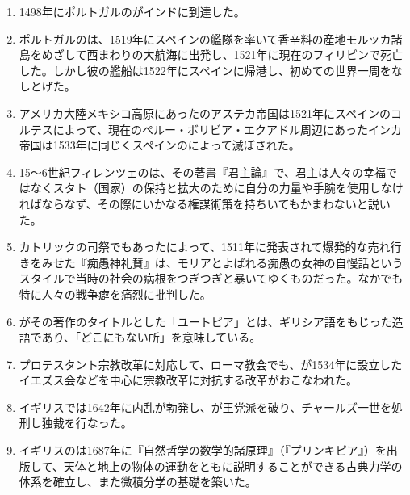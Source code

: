 \documentclass[uplatex,dvipdfmx]{jsarticle}
\newcounter{qnumber}\setcounter{qnumber}{1}
\def\anaume{\hspace{.5zw}\framebox[1.5cm]{\bf \theqnumber}\hspace{.5zw}\stepcounter{qnumber}}
\begin{document}
\begin{enumerate}


  
\item  1498年にポルトガルのがインドに到達した。

\item ポルトガルのは、1519年にスペインの艦隊を率いて香辛料の産地モルッカ諸島をめざして西まわりの大航海に出発し、1521年に現在のフィリピンで死亡した。しかし彼の艦船は1522年にスペインに帰港し、初めての世界一周をなしとげた。

  
\item  アメリカ大陸メキシコ高原にあったのアステカ帝国は1521年にスペインのコルテスによって、現在のペルー・ボリビア・エクアドル周辺にあったインカ帝国は1533年に同じくスペインのによって滅ぼされた。

\item 15〜6世紀フィレンツェのは、その著書『君主論』で、君主は人々の幸福ではなくスタト（国家）の保持と拡大のために自分の力量や手腕を使用しなければならなず、その際にいかなる権謀術策を持ちいてもかまわないと説いた。

\item カトリックの司祭でもあったによって、1511年に発表されて爆発的な売れ行きをみせた『痴愚神礼賛』は、モリアとよばれる痴愚の女神の自慢話というスタイルで当時の社会の病根をつぎつぎと暴いてゆくものだった。なかでも特に人々の戦争癖を痛烈に批判した。

\item {}がその著作のタイトルとした「ユートピア」とは、ギリシア語をもじった造語であり、「どこにもない所」を意味している。


  
\item  プロテスタント宗教改革に対応して、ローマ教会でも、が1534年に設立したイエズス会などを中心に宗教改革に対抗する改革がおこなわれた。

\item イギリスでは1642年に内乱が勃発し、が王党派を破り、チャールズ一世を処刑し独裁を行なった。
  
\item イギリスのは1687年に『自然哲学の数学的諸原理』（『プリンキピア』）を出版して、天体と地上の物体の運動をともに説明することができる古典力学の体系を確立し、また微積分学の基礎を築いた。
  
\end{enumerate}
\end{document}
